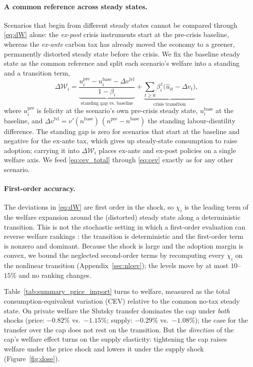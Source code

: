 \paragraph{A common reference across steady states.} Scenarios that begin from
different steady states cannot be compared through \eqref{eq:dW} alone: the
\emph{ex-post} crisis instruments start at the pre-crisis baseline, whereas the
\emph{ex-ante} carbon tax has already moved the economy to a greener, permanently
distorted steady state before the crisis. We fix the baseline steady state as the
common reference and split each scenario's welfare into a standing and a transition
term,
%
\begin{equation}
  \Delta\mathcal{W}_i=
  \underbrace{\frac{u^{\mathrm{pre}}_i-u^{\mathrm{base}}_i-\Delta v^{\mathrm{lvl}}}{1-\beta_i}}_{\text{standing gap vs.\ baseline}}
  +\underbrace{\sum_{t\ge0}\beta_i^{\,t}\bigl(\widehat{u}_{it}-\Delta v_t\bigr)}_{\text{crisis transition}},
  \label{eq:cev_total}
\end{equation}
%
where $u^{\mathrm{pre}}_i$ is felicity at the scenario's own pre-crisis steady state,
$u^{\mathrm{base}}_i$ at the baseline, and
$\Delta v^{\mathrm{lvl}}=v'(n^{\mathrm{base}})\,(n^{\mathrm{pre}}-n^{\mathrm{base}})$
the standing labour-disutility difference. The standing gap is zero for scenarios
that start at the baseline and negative for the ex-ante tax, which gives up
steady-state consumption to raise adoption; carrying it into $\Delta\mathcal{W}_i$
places ex-ante and ex-post policies on a single welfare axis. We feed
\eqref{eq:cev_total} through \eqref{eq:cev} exactly as for any other scenario.

\paragraph{First-order accuracy.} The deviations in \eqref{eq:dW} are first order in
the shock, so $\chi_i$ is the leading term of the welfare expansion around the
(distorted) steady state along a deterministic transition. This is not the
stochastic setting in which a first-order evaluation can reverse welfare rankings
\citep{KimKim2003,BenignoWoodford2005}: the transition is deterministic and the
first-order term is nonzero and dominant. Because the shock is large and the
adoption margin is convex, we bound the neglected second-order terms by recomputing
every $\chi_i$ on the nonlinear transition (Appendix~\ref{sec:nlcev}); the levels
move by at most $10$--$15\%$ and no ranking changes.

Table~\ref{tab:summary_price_import} turns to welfare, measured as the total
consumption-equivalent variation (CEV) relative to the common no-tax steady
state. On private welfare the Slutsky transfer dominates the cap under
\emph{both} shocks (price: $-0.82\%$ vs.\ $-1.15\%$; supply: $-0.29\%$ vs.\ $-1.08\%$); the case for the transfer over the cap
does not rest on the transition. But the \emph{direction} of the cap's welfare
effect turns on the supply elasticity: tightening the cap raises welfare under
the price shock and lowers it under the supply shock (Figure~\ref{fig:dose}).


